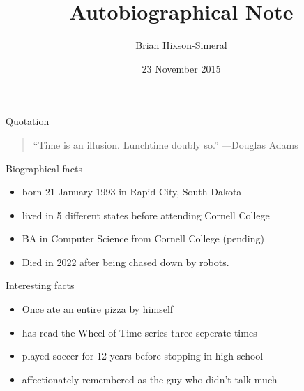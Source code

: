 \documentclass{beamer}
\title{Autobiographical Note}
\author{Brian Hixson-Simeral}
\institute{Cornell College}
\date{23 November 2015}
\begin{document}
\begin{frame}
  \titlepage
\end{frame}

\begin{frame}{Quotation}
\begin{quotation}
\noindent
``Time is an illusion. Lunchtime doubly so.''
  \flushright
  ---Douglas Adams
  \end{quotation}
\end{frame}

\begin{frame}{Biographical facts}
\begin{itemize}
  \item born 21 January 1993 in Rapid City, South Dakota
  \item lived in 5 different states before attending Cornell College
  \item BA in Computer Science from Cornell College (pending)
  \item Died in 2022 after being chased down by robots.
  \end{itemize}
\end{frame}

\begin{frame}{Interesting facts}
\begin{itemize}
  \item Once ate an entire pizza by himself
  \item has read the Wheel of Time series three seperate times
  \item played soccer for 12 years before stopping in high school
  \item affectionately remembered as the guy who didn't talk much
  \end{itemize}
\end{frame}

\end{document}
